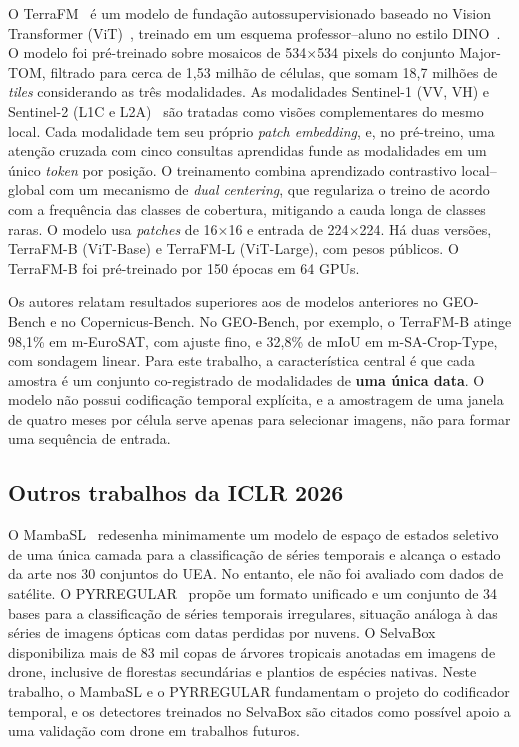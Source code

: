 \documentclass[conference]{IEEEtran}
\begin{document}
O TerraFM~\citep{danish2026terrafm} é um modelo de fundação autossupervisionado baseado no Vision Transformer (ViT)~\citep{dosovitskiy2021}, treinado em um esquema professor--aluno no estilo DINO~\citep{caron2021}. O modelo foi pré-treinado sobre mosaicos de 534$\times$534 pixels do conjunto Major-TOM, filtrado para cerca de 1,53 milhão de células, que somam 18,7 milhões de \textit{tiles} considerando as três modalidades. As modalidades Sentinel-1 (VV, VH) e Sentinel-2 (L1C e L2A)~\citep{torres2012,drusch2012} são tratadas como visões complementares do mesmo local. Cada modalidade tem seu próprio \textit{patch embedding}, e, no pré-treino, uma atenção cruzada com cinco consultas aprendidas funde as modalidades em um único \textit{token} por posição. O treinamento combina aprendizado contrastivo local--global com um mecanismo de \textit{dual centering}, que regulariza o treino de acordo com a frequência das classes de cobertura, mitigando a cauda longa de classes raras. O modelo usa \textit{patches} de 16$\times$16 e entrada de 224$\times$224. Há duas versões, TerraFM-B (ViT-Base) e TerraFM-L (ViT-Large), com pesos públicos. O TerraFM-B foi pré-treinado por 150 épocas em 64 GPUs.

Os autores relatam resultados superiores aos de modelos anteriores no GEO-Bench e no Copernicus-Bench. No GEO-Bench, por exemplo, o TerraFM-B atinge 98,1\% em m-EuroSAT, com ajuste fino, e 32,8\% de mIoU em m-SA-Crop-Type, com sondagem linear. Para este trabalho, a característica central é que cada amostra é um conjunto co-registrado de modalidades de \textbf{uma única data}. O modelo não possui codificação temporal explícita, e a amostragem de uma janela de quatro meses por célula serve apenas para selecionar imagens, não para formar uma sequência de entrada.

\subsection{Outros trabalhos da ICLR 2026}

O MambaSL~\citep{jung2026mambasl} redesenha minimamente um modelo de espaço de estados seletivo~\citep{gu2023mamba} de uma única camada para a classificação de séries temporais e alcança o estado da arte nos 30 conjuntos do UEA. No entanto, ele não foi avaliado com dados de satélite. O PYRREGULAR~\citep{spinnato2026pyrregular} propõe um formato unificado e um conjunto de 34 bases para a classificação de séries temporais irregulares, situação análoga à das séries de imagens ópticas com datas perdidas por nuvens. O SelvaBox~\citep{baudchon2026selvabox} disponibiliza mais de 83 mil copas de árvores tropicais anotadas em imagens de drone, inclusive de florestas secundárias e plantios de espécies nativas. Neste trabalho, o MambaSL e o PYRREGULAR fundamentam o projeto do codificador temporal, e os detectores treinados no SelvaBox são citados como possível apoio a uma validação com drone em trabalhos futuros.
\end{document}
